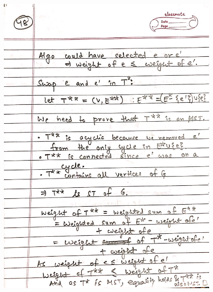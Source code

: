 \begin{figure}[H]
    \centering
    \includegraphics[scale=0.25]{"./MIT-6.042J/MIT-6042J-048"}
\end{figure}
\newpage
